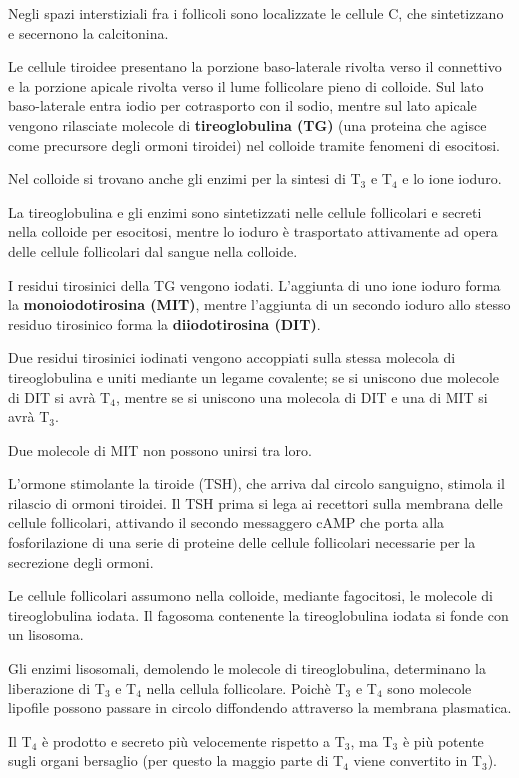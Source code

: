 \documentclass[]{article}
\begin{document}
Negli spazi interstiziali fra i follicoli sono localizzate le cellule C,
che sintetizzano e secernono la calcitonina.

Le cellule tiroidee presentano la porzione baso-laterale rivolta verso
il connettivo e la porzione apicale rivolta verso il lume follicolare
pieno di colloide. Sul lato baso-laterale entra iodio per cotrasporto
con il sodio, mentre sul lato apicale vengono rilasciate molecole di
\textbf{tireoglobulina (TG)} (una proteina che agisce come precursore
degli ormoni tiroidei) nel colloide tramite fenomeni di esocitosi.

Nel colloide si trovano anche gli enzimi per la sintesi di T\(_3\) e
T\(_4\) e lo ione ioduro.

La tireoglobulina e gli enzimi sono sintetizzati nelle cellule
follicolari e secreti nella colloide per esocitosi, mentre lo ioduro è
trasportato attivamente ad opera delle cellule follicolari dal sangue
nella colloide.

I residui tirosinici della TG vengono iodati. L'aggiunta di uno ione
ioduro forma la \textbf{monoiodotirosina (MIT)}, mentre l'aggiunta di un
secondo ioduro allo stesso residuo tirosinico forma la
\textbf{diiodotirosina (DIT)}.

Due residui tirosinici iodinati vengono accoppiati sulla stessa molecola
di tireoglobulina e uniti mediante un legame covalente; se si uniscono
due molecole di DIT si avrà T\(_4\), mentre se si uniscono una molecola
di DIT e una di MIT si avrà T\(_3\).

Due molecole di MIT non possono unirsi tra loro.

L'ormone stimolante la tiroide (TSH), che arriva dal circolo sanguigno,
stimola il rilascio di ormoni tiroidei. Il TSH prima si lega ai
recettori sulla membrana delle cellule follicolari, attivando il secondo
messaggero cAMP che porta alla fosforilazione di una serie di proteine
delle cellule follicolari necessarie per la secrezione degli ormoni.

Le cellule follicolari assumono nella colloide, mediante fagocitosi, le
molecole di tireoglobulina iodata. Il fagosoma contenente la
tireoglobulina iodata si fonde con un lisosoma.

Gli enzimi lisosomali, demolendo le molecole di tireoglobulina,
determinano la liberazione di T\(_3\) e T\(_4\) nella cellula
follicolare. Poichè T\(_3\) e T\(_4\) sono molecole lipofile possono
passare in circolo diffondendo attraverso la membrana plasmatica.

Il T\(_4\) è prodotto e secreto più velocemente rispetto a T\(_3\), ma
T\(_3\) è più potente sugli organi bersaglio (per questo la maggio parte
di T\(_4\) viene convertito in T\(_3\)).
\end{document}
